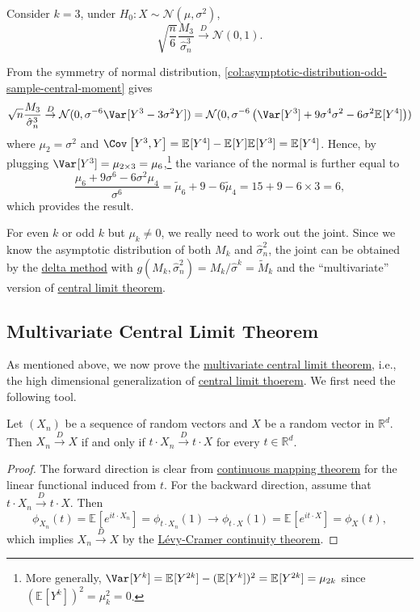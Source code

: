 \begin{eg}
	Consider \(k = 3\), under \(H_0 \colon X \sim \mathcal{N} (\mu , \sigma ^2)\),
	\[
		\sqrt{\frac{n}{6}} \frac{M_3}{\hat{\sigma} _n^3}
		\overset{D}{\to} \mathcal{N} (0, 1).
	\]
\end{eg}
\begin{explanation}
	From the symmetry of normal distribution, \autoref{col:asymptotic-distribution-odd-sample-central-moment} gives
	\[
		\sqrt{n} \frac{M_3}{\hat{\sigma} _n^3}
		\overset{D}{\to} \mathcal{N} (0, \sigma ^{-6} \Var_{}[Y^3 - 3 \sigma ^2 Y] )
		= \mathcal{N} (0, \sigma ^{-6} \left( \Var_{}[Y^3] + 9 \sigma ^4 \sigma ^2 - 6 \sigma ^2 \mathbb{E}_{}[Y^4] \right) )
	\]
	where  \(\mu _2 = \sigma ^2\) and \(\Cov_{}\left[Y^3 , Y\right] = \mathbb{E}_{}[Y^4] - \mathbb{E}_{}[Y] \mathbb{E}_{}[Y^3] = \mathbb{E}_{}[Y^4] \). Hence, by plugging \(\Var_{}[Y^3] = \mu _{2 \times 3} = \mu _6\),\footnote{More generally, \(\Var_{}[Y^k] = \mathbb{E}_{}[Y^{2k} ] - (\mathbb{E}_{}[Y^k] )^2 = \mathbb{E}_{}[Y^{2k} ] = \mu _{2k}\) since \((\mathbb{E}_{}[Y^k] )^2 = \mu _k^2 = 0\).} the variance of the normal is further equal to
	\[
		\frac{\mu _6 + 9 \sigma ^6 - 6 \sigma ^2 \mu _4}{\sigma ^6}
		= \widetilde{\mu} _6 + 9 - 6 \widetilde{\mu} _4
		= 15 + 9 - 6 \times 3
		= 6,
	\]
	which provides the result.
\end{explanation}

For even \(k\) or odd \(k\) but \(\mu _k \neq 0\), we really need to work out the joint. Since we know the asymptotic distribution of both \(M_k\) and \(\hat{\sigma} _n^2\), the joint can be obtained by the \hyperref[thm:delta-method]{delta method} with \(g(M_k , \hat{\sigma} _n^2) = M_k / \hat{\sigma} ^k = \widetilde{M} _k\) and the ``multivariate'' version of \hyperref[thm:CLT]{central limit theorem}.

\subsection{Multivariate Central Limit Theorem}
As mentioned above, we now prove the \hyperref[thm:multivariate-CLT]{multivariate central limit theorem}, i.e., the high dimensional generalization of \hyperref[thm:CLT]{central limit thoerem}. We first need the following tool.

\begin{theorem}\label{thm:Cramer-Wold-device}
	Let \((X_n)\) be a sequence of random vectors and \(X\) be a random vector in \(\mathbb{R} ^d\). Then \(X_n \overset{D}{\to} X\) if and only if \(t \cdot X_n \overset{D}{\to} t \cdot X\) for every \(t \in \mathbb{R} ^d\).
\end{theorem}
\begin{proof}
	The forward direction is clear from \hyperref[thm:continuous-mapping]{continuous mapping theorem} for the linear functional induced from \(t\). For the backward direction, assume that \(t \cdot X_n \overset{D}{\to} t \cdot X\). Then
	\[
		\phi _{X_n}(t)
		= \mathbb{E}_{}[e^{i t \cdot X_n}]
		= \phi _{t \cdot X_n}(1)
		\to \phi _{t \cdot X}(1)
		= \mathbb{E}_{}[e^{i t \cdot X}]
		= \phi _X(t),
	\]
	which implies \(X_n \overset{D}{\to} X\) by the \hyperref[thm:Levy-Cramer-continuity]{Lévy-Cramer continuity theorem}.
\end{proof}

